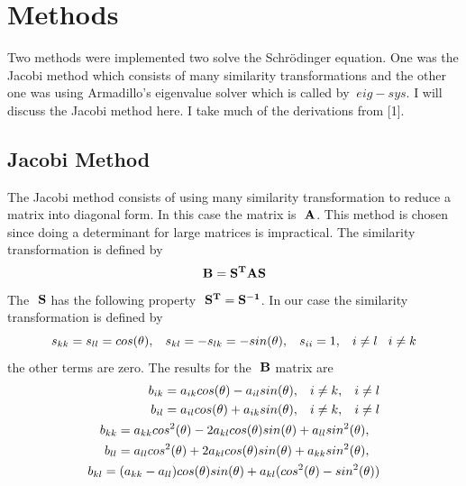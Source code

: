 \documentclass[11pt,a4wide]{article}
\begin{document}
\section{Methods}
Two methods were implemented two solve the Schr\"odinger equation. One was the Jacobi method which consists of many similarity transformations and the other one was using Armadillo's eigenvalue solver which is called by $\ eig-sys$. I will discuss the Jacobi method here. I take much of the derivations from [1]. 
\subsection{Jacobi Method}
The Jacobi method consists of using many similarity transformation to reduce a matrix into diagonal form. In this case the matrix is $\ {\bf A}$. This method is chosen since doing a determinant for large matrices is impractical. The similarity transformation is defined by 
\[
	{\bf B} ={\bf S^{T}AS}
\]
The $\ {\bf S}$ has the following property $\ {\bf S^T}={\bf S^{-1}}$. In our case the similarity transformation is defined by 
\[
	s_{kk} =s_{ll}=cos(\theta), \hspace{0.3cm} s_{kl}=-s_{lk}=-sin(\theta), \hspace{0.3cm} s_{ii} =1 , \hspace{0.3cm} 
	 i \neq l \hspace{0.3cm} i \neq k
\]
the other terms are zero. The results for the $\ {\bf B}$ matrix are 
\begin{equation}
\begin{split}
 	b_{ik}=a_{ik}cos(\theta) -a_{il}sin(\theta), \hspace{0.3cm} i \neq k, \hspace{0.3cm} i \neq l \\
 	b_{il}=a_{il}cos(\theta)+a_{ik}sin(\theta), \hspace{0.3cm} i \neq k, \hspace{0.3cm} i \neq l \\
 	b_{kk}=a_{kk}cos^2(\theta) -2a_{kl}cos(\theta)sin(\theta) +a_{ll}sin^2(\theta), \hspace{0.3cm} \\
 	b_{ll}=a_{ll}cos^2(\theta)+2a_{kl}cos(\theta)sin(\theta) +a_{kk}sin^2(\theta), \hspace{0.3cm} \\
 	b_{kl}=(a_{kk} - a_{ll})cos(\theta)sin(\theta) +a_{kl}(cos^2(\theta) -sin^2(\theta))   \\
\end{split}
\end{equation}
\end{document}
